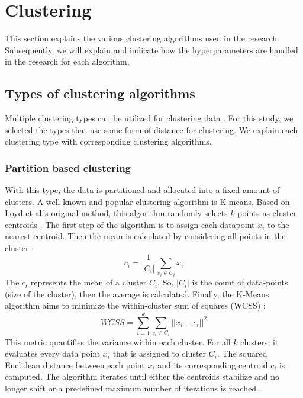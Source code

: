 \section{Clustering}
This section explains the various clustering algorithms used in the research.
Subsequently, we will explain and indicate how the hyperparameters are handled in the research for each algorithm.
\subsection{Types of clustering algorithms}
Multiple clustering types can be utilized for clustering data \citep{xu_comprehensive_2015}.
For this study, we selected the types that use some form of distance for clustering.
We explain each clustering type with corresponding clustering algorithms.
\subsubsection{Partition based clustering}
With this type, the data is partitioned and allocated into a fixed amount of clusters.
A well-known and popular clustering algorithm is K-means.
Based on Loyd et al.'s original method, this algorithm randomly selects $k$ points as cluster centroids \citep{1056489}.
The first step of the algorithm is to assign each datapoint $x_i$ to the nearest centroid.
Then the mean is calculated by considering all points in the cluster \citep{yuan_research_2019}:
\begin{equation}
  c_i = \frac{1}{|C_i|} \sum_{x_i \in C_i} x_i
\end{equation}
The $c_i$ represents the mean of a cluster $C_i$,
So, $|C_i|$ is the count of data-points (size of the cluster), then the average is calculated.
Finally, the K-Means algorithm aims to minimize the within-cluster sum of squares (WCSS) \citep{yuan_research_2019}:
\begin{equation}
  WCSS = \sum_{i=1}^{k} \sum_{c_i \in C_i} || x_i - c_i ||^2
\end{equation}
This metric quantifies the variance within each cluster. For all \( k \) clusters, it evaluates every data point \( x_i \) that is assigned to cluster \( C_i \).
The squared Euclidean distance between each point \( x_i \) and its corresponding centroid \( c_i \) is computed.
The algorithm iterates until either the centroids stabilize and no longer shift or a predefined maximum number of iterations is reached \citep{yuan_research_2019}.

